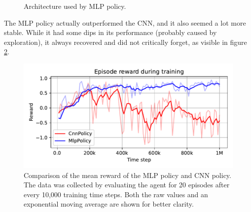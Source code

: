 \documentclass[
  digital,     %
  oneside,     %
  nosansbold,  %
  nocolorbold, %
  lof,         %
  lot,         %
]{fithesis4}
\begin{document}
\begin{figure}
    \caption{Architecture used by MLP policy.}
    \label{fig:mlp_policy}
\end{figure}

The MLP policy actually outperformed the CNN, and it also seemed a lot more stable. While it had some dips in its performance (probably caused by exploration), it always recovered and did not critically forget, as visible in figure \ref{fig:v2_mlp_cnn}.

\begin{figure}
    \includegraphics[width=1\linewidth]{graphs/v2_mpl_cnn.pdf}
    \caption{Comparison of the mean reward of the MLP policy and CNN policy. The data was collected by evaluating the agent for 20 episodes after every 10,000 training time steps. Both the raw values and an exponential moving average are shown for better clarity.}
    \label{fig:v2_mlp_cnn}
\end{figure}
\end{document}
